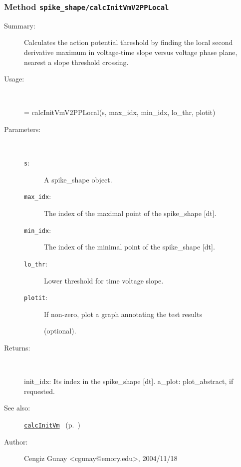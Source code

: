 \subsubsection[Method \texttt{calcInitVmV2PPLocal}]{Method \texttt{spike\_shape/calcInitVmV2PPLocal}}%
%
\label{ref_spike_shape__calcInitVmV2PPLocal}%
\hypertarget{ref_spike_shape__calcInitVmV2PPLocal}{}%
\begin{description}
\item[Summary:]Calculates the action potential threshold by finding the local second derivative maximum in voltage-time slope versus voltage phase plane, nearest a slope threshold crossing.
%
\item[Usage:]~%
\begin{lyxcode}%
[init\_idx, a\_plot] = calcInitVmV2PPLocal(s, max\_idx, min\_idx, lo\_thr, plotit)
%
\end{lyxcode}%
%
%
\item[Parameters:]~
\begin{description}%
\item[\texttt{s}:]
 A spike\_shape object.
\item[\texttt{max\_idx}:]
 The index of the maximal point of the spike\_shape [dt].
\item[\texttt{min\_idx}:]
 The index of the minimal point of the spike\_shape [dt].
\item[\texttt{lo\_thr}:]
 Lower threshold for time voltage slope.
\item[\texttt{plotit}:]
 If non-zero, plot a graph annotating the test results 

(optional).
\end{description}%
%
\item[Returns:
]~

	init\_idx: Its index in the spike\_shape [dt].
	a\_plot: plot\_abstract, if requested.
%
%
\item[See also:]%
\hyperlink{ref_calcInitVm}{\texttt{calcInitVm}}%
\ (p.~\pageref{ref_calcInitVm})%
%
%
\item[Author:]%
Cengiz Gunay <cgunay@emory.edu>, 2004/11/18
%
\end{description}
\methodline%
